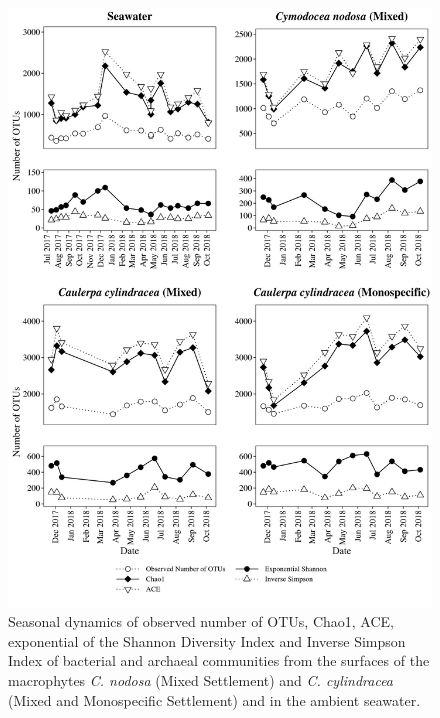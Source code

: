 \documentclass[12pt,]{article}
\begin{document}
\begin{figure}[H]

{\centering \includegraphics[width=0.85\linewidth]{../results/figures/calculators} 

}

\caption{Seasonal dynamics of observed number of OTUs, Chao1, ACE, exponential of the Shannon Diversity Index and Inverse Simpson Index of bacterial and archaeal communities from the surfaces of the macrophytes \textit{C. nodosa} (Mixed Settlement) and \textit{C. cylindracea} (Mixed and Monospecific Settlement) and in the ambient seawater.\label{calculators}}\label{fig:unnamed-chunk-2}
\end{figure}
\end{document}
